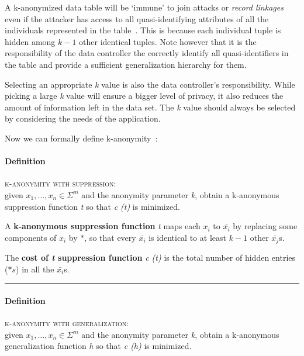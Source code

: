 A k-anonymized data table will be `immune' to join attacks or \textit{record linkages} even if the attacker has access to all quasi-identifying attributes of all the individuals represented in the table~\cite{aggarwal}.
This is because each individual tuple is hidden among \(k-1\) other identical tuples.
Note however that it is the responsibility of the  data controller the correctly identify all quasi-identifiers in the table and provide a sufficient generalization hierarchy for them.

Selecting an appropriate \textit{k} value is also the data controller's responsibility.
While picking a large \textit{k} value will ensure a bigger level of privacy, it also reduces the amount of information left in the data set.
The \textit{k} value should always be selected by considering the needs of the application.



Now we can formally define k-anonymity~\cite{aggarwal}:

\paragraph{Definition} \textsc{k-anonymity with suppression}: \\
given \(x_1,\ldots,x_n \in \Sigma^m\) and the anonymity parameter \textit{k}, obtain a k-anonymous suppression function \textit{t} so that \textit{c (t)} is minimized.

A \textbf{k-anonymous suppression function} \textit{t} maps each \(x_i\) to \(\bar{x_i}\) by replacing some components of \(x_i\) by \(*\), so that every \(\bar{x_i}\) is identical to at least \(k-1\) other \(\bar{x_j}\)s.

The \textbf{cost of \textit{t} suppression function} \textit{c (t)} is the total number of hidden entries (\(*s\)) in all the \(\bar{x_i}\)s.

\begin{center}
    \rule{0.9\textwidth}{0.3pt}
\end{center}

\paragraph{Definition} \textsc{k-anonymity with generalization}: \\
given \(x_1,\ldots,x_n \in \Sigma^m\) and the anonymity parameter \textit{k}, obtain a k-anonymous generalization function \textit{h} so that \textit{c (h)} is minimized.

